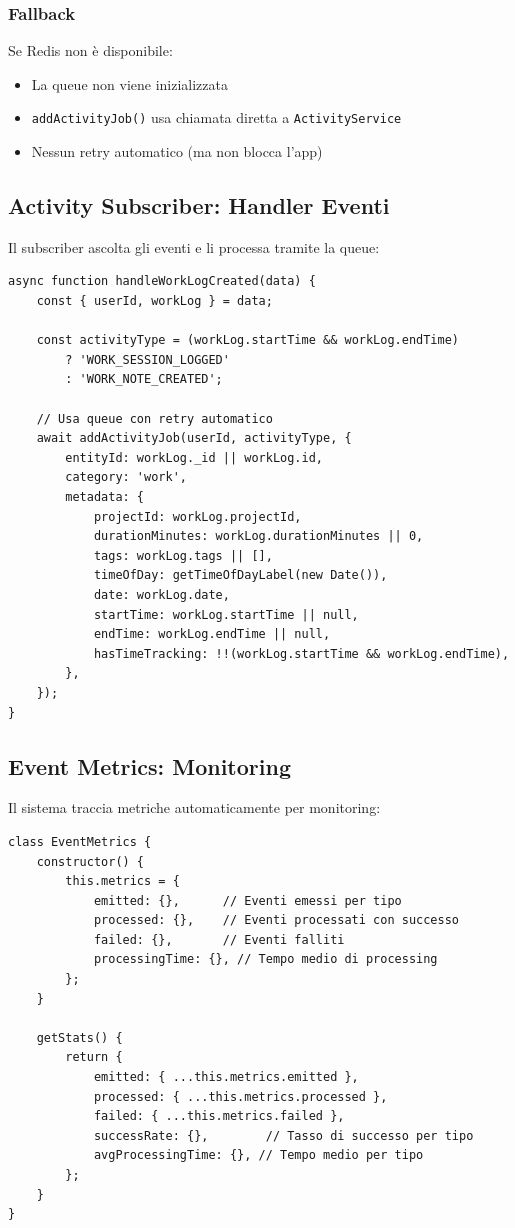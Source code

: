\documentclass[11pt,a4paper]{article}
\begin{document}
\subsubsection{Fallback}

Se Redis non è disponibile:
\begin{itemize}
    \item La queue non viene inizializzata
    \item \texttt{addActivityJob()} usa chiamata diretta a \texttt{ActivityService}
    \item Nessun retry automatico (ma non blocca l'app)
\end{itemize}

\subsection{Activity Subscriber: Handler Eventi}

Il subscriber ascolta gli eventi e li processa tramite la queue:

\begin{lstlisting}[caption=Handler worklog.created]
async function handleWorkLogCreated(data) {
    const { userId, workLog } = data;
    
    const activityType = (workLog.startTime && workLog.endTime) 
        ? 'WORK_SESSION_LOGGED' 
        : 'WORK_NOTE_CREATED';

    // Usa queue con retry automatico
    await addActivityJob(userId, activityType, {
        entityId: workLog._id || workLog.id,
        category: 'work',
        metadata: {
            projectId: workLog.projectId,
            durationMinutes: workLog.durationMinutes || 0,
            tags: workLog.tags || [],
            timeOfDay: getTimeOfDayLabel(new Date()),
            date: workLog.date,
            startTime: workLog.startTime || null,
            endTime: workLog.endTime || null,
            hasTimeTracking: !!(workLog.startTime && workLog.endTime),
        },
    });
}
\end{lstlisting}

\subsection{Event Metrics: Monitoring}

Il sistema traccia metriche automaticamente per monitoring:

\begin{lstlisting}[caption=Event Metrics]
class EventMetrics {
    constructor() {
        this.metrics = {
            emitted: {},      // Eventi emessi per tipo
            processed: {},    // Eventi processati con successo
            failed: {},       // Eventi falliti
            processingTime: {}, // Tempo medio di processing
        };
    }
    
    getStats() {
        return {
            emitted: { ...this.metrics.emitted },
            processed: { ...this.metrics.processed },
            failed: { ...this.metrics.failed },
            successRate: {},        // Tasso di successo per tipo
            avgProcessingTime: {}, // Tempo medio per tipo
        };
    }
}
\end{lstlisting}
\end{document}
